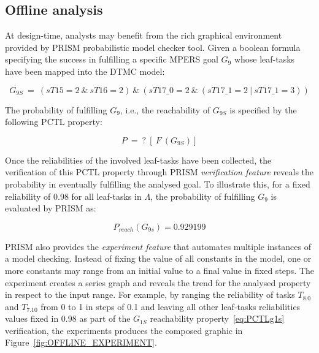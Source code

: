 
\subsection{Offline analysis}


At design-time, analysts may benefit from the rich graphical environment provided by PRISM probabilistic model checker tool. Given a boolean formula specifying the success in fulfilling a specific MPERS goal $G_9$ whose leaf-tasks have been mapped into the DTMC model:

\begin{equation}\label{eq:Gx}
G_{9S}\ =\ (sT15=2\ \&\ sT16=2)\ \&\ (sT17\_0=2\ \&\ (sT17\_1=2\ |\ sT17\_1=3))
\end{equation}

The probability of fulfilling $G_9$, i.e., the reachability of $G_{9S}$ is specified by the following PCTL property:

\begin{equation}\label{eq:PCTLx}
P\ =\ ?\ [\ F\ (G_{9S})]
\end{equation}

Once the reliabilities of the involved leaf-tasks have been collected, the verification of this PCTL property through PRISM \textit{verification feature} reveals the probability in eventually fulfilling the analysed goal. To illustrate this, for a fixed reliability of $0.98$ for all leaf-tasks in $\Lambda$, the probability of fulfilling $G_9$ is evaluated by PRISM as:

$$P_{reach}(G_{9s})=0.929199$$

PRISM also provides the \textit{experiment feature} that automates multiple instances of a model checking. Instead of fixing the value of all constants in the model, one or more constants may range from an initial value to a final value in fixed steps. The experiment creates a series graph and reveals the trend for the analysed property in respect to the input range. For example, by ranging the reliability of tasks $T_{8.0}$ and $T_{7.10}$ from 0 to 1 in steps of 0.1 and leaving all other leaf-tasks reliabilities values fixed in $0.98$ as part of the $G_{1S}$ reachability property~\eqref{eq:PCTLg1s} verification, the experiments produces the composed graphic in Figure~\ref{fig:OFFLINE_EXPERIMENT}.

